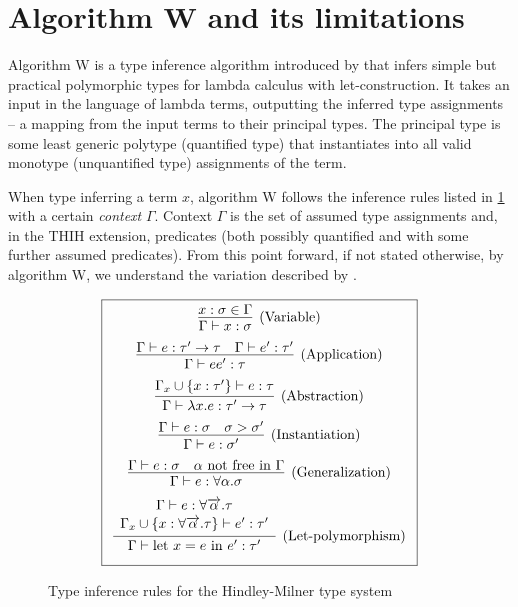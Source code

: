 \section{Algorithm W and its limitations}

Algorithm W is a type inference algorithm introduced by \citet{damas1982principal} that infers simple but practical polymorphic types for lambda calculus with let-construction. It takes an input in the language of lambda terms, outputting the inferred type assignments -- a mapping from the input terms to their principal types. The principal type is some least generic polytype (quantified type) that instantiates into all valid monotype (unquantified type) assignments of the term.

When type inferring a term $x$, algorithm W follows the inference rules listed in \cref{fig:wRules} with a certain \emph{context} $\Gamma$. Context $\Gamma$ is the set of assumed type assignments and, in the THIH extension, predicates (both possibly quantified and with some further assumed predicates). From this point forward, if not stated otherwise, by algorithm W, we understand the variation described by \citet{jones1999typing}.

\begin{figure}
    \caption{Type inference rules for the Hindley-Milner type system}
    \label{fig:wRules}
    $$\boxed{\renewcommand{\arraystretch}{2.2}\begin{array}{cc}
        \infer[\text{(Variable)}]{\Gamma \vdash x : \sigma}{x : \sigma \in \Gamma} \\
        \infer[\text{(Application)}]{\Gamma \vdash e e' : \tau}{\Gamma \vdash e : \tau' \rightarrow \tau & \Gamma \vdash e' : \tau'} \\
        \infer[\text{(Abstraction)}]{\Gamma \vdash \lambda x . e : \tau' \rightarrow \tau}{\Gamma_x \cup \{x : \tau'\} \vdash e : \tau} \\
        \infer[\text{(Instantiation)}]{\Gamma \vdash e : \sigma'}{\Gamma \vdash e : \sigma & \sigma > \sigma'}\\
        \infer[\text{(Generalization)}]{\Gamma \vdash e : \forall \alpha . \sigma}{\Gamma \vdash e : \sigma & \alpha \text{ not free in }\Gamma}\\
        \infer[\text{(Let-polymorphism)}]{\Gamma \vdash \text{let } x = e \text{ in } e' : \tau'}{\renewcommand{\arraystretch}{1.1}\begin{array}{c}\Gamma \vdash e : \forall \vect{\alpha} . \tau \\ \Gamma_x \cup \{x :\forall \vect{\alpha} . \tau \} \vdash e' : \tau'\end{array}}
    \end{array}}$$
\end{figure}

